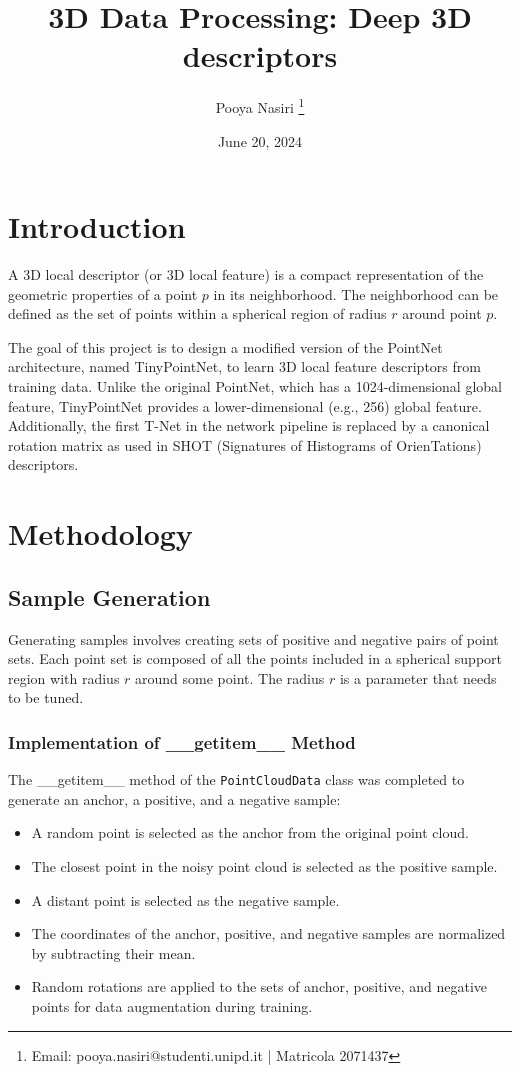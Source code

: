 \documentclass{article}
\title{3D Data Processing: Deep 3D descriptors}
\author{Pooya Nasiri \thanks{Email: pooya.nasiri@studenti.unipd.it | Matricola 2071437}}
\date{June 20, 2024}
\begin{document}
\maketitle

\section{Introduction}
A 3D local descriptor (or 3D local feature) is a compact representation of the geometric properties of a point \( p \) in its neighborhood. The neighborhood can be defined as the set of points within a spherical region of radius \( r \) around point \( p \).

The goal of this project is to design a modified version of the PointNet architecture, named TinyPointNet, to learn 3D local feature descriptors from training data. Unlike the original PointNet, which has a 1024-dimensional global feature, TinyPointNet provides a lower-dimensional (e.g., 256) global feature. Additionally, the first T-Net in the network pipeline is replaced by a canonical rotation matrix as used in SHOT (Signatures of Histograms of OrienTations) descriptors.

\section{Methodology}

\subsection{Sample Generation}
Generating samples involves creating sets of positive and negative pairs of point sets. Each point set is composed of all the points included in a spherical support region with radius \( r \) around some point. The radius \( r \) is a parameter that needs to be tuned.

\subsubsection{Implementation of \_\_getitem\_\_ Method}
The \_\_getitem\_\_ method of the \texttt{PointCloudData} class was completed to generate an anchor, a positive, and a negative sample:
\begin{itemize}
    \item A random point is selected as the anchor from the original point cloud.
    \item The closest point in the noisy point cloud is selected as the positive sample.
    \item A distant point is selected as the negative sample.
    \item The coordinates of the anchor, positive, and negative samples are normalized by subtracting their mean.
    \item Random rotations are applied to the sets of anchor, positive, and negative points for data augmentation during training.
\end{itemize}
\end{document}
